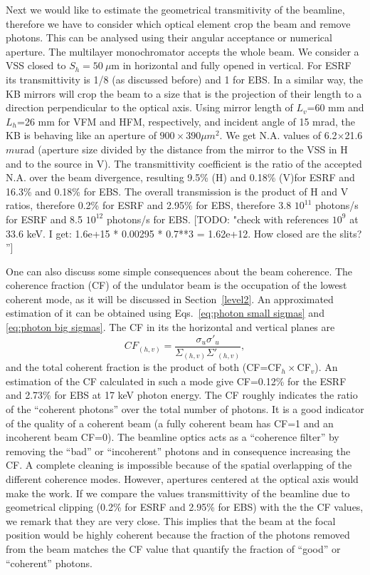 \documentclass{iucr}              %
\newcommand{\todo}[1]{{\color{red}[TODO: "#1'']}}
\begin{document}
Next we would like to estimate the geometrical transmitivity of the beamline, therefore we have to consider which optical element crop the beam and remove photons. This can be analysed using their angular acceptance or numerical aperture. The multilayer monochromator accepts the whole beam. We consider a VSS closed to $S_h=50~\mu$m in horizontal and fully opened in vertical. For ESRF its transmittivity is 1/8 (as discussed before) and 1 for EBS. In a similar way, the KB mirrors will crop the beam to a size that is the projection of their length to a direction perpendicular to the optical axis. Using mirror length of $L_v$=60 mm and $L_h$=26 mm for VFM and HFM, respectively, and incident angle of 15 mrad, the KB is behaving like an aperture of $900 \times 390 \mu m^2$. We get N.A. values of 6.2$\times$21.6 $mu$rad (aperture size divided by the distance from the mirror to the VSS in H and to the source in V). The transmittivity coefficient is the ratio of the accepted N.A. over the beam divergence, resulting 9.5\% (H) and 0.18\% (V)for ESRF and 16.3\% and 0.18\% for EBS. The overall transmission is the product of H and V ratios, therefore 0.2\% for ESRF and 2.95\% for EBS, therefore 3.8 $10^{11}$ photons/s for ESRF and 8.5 $10^{12}$ photons/s for EBS. 
\todo{check with references $10^9$ at 33.6 keV. I get: 1.6e+15 * 0.00295 * 0.7**3 = 1.62e+12. How closed are the slits? }

One can also discuss some simple consequences about the beam coherence. The coherence fraction (CF) \cite{arxivCF} of the undulator beam is the occupation of the lowest coherent mode, as it will be discussed in Section~\ref{level2}. An approximated estimation of it can be obtained using Eqs.~\ref{eq:photon small sigmas} and \ref{eq:photon big sigmas}. The CF in its the horizontal and vertical planes are
\begin{equation}\label{eq:coherent fraction}
 CF_{(h,v)} = \frac{\sigma_u \sigma'_u}{\Sigma_{(h,v)} \Sigma'_{(h,v)}},
\end{equation}
and the total coherent fraction is the product of both (CF=CF$_h \times $CF$_v$). An estimation of the CF calculated in such a mode give CF=0.12\% for the ESRF and 2.73\% for EBS at 17 keV photon energy. The CF roughly indicates the ratio of the ``coherent photons'' over the total number of photons. It is a good indicator of the quality of a coherent beam (a fully coherent beam has CF=1 and an incoherent beam CF=0). The beamline optics acts as a ``coherence filter'' by removing the ``bad'' or ``incoherent'' photons and in consequence increasing the CF. A complete cleaning is impossible because of the spatial overlapping of the different coherence modes. However, apertures centered at the optical axis would make the work. If we compare the values transmittivity of the beamline due to geometrical clipping  (0.2\% for ESRF and 2.95\% for EBS) with the the CF values, we remark that they are very close. This implies that the beam at the focal position would be highly coherent because the fraction of the photons removed from the beam matches the CF value that quantify the fraction of ``good'' or ``coherent'' photons. 
\end{document}
